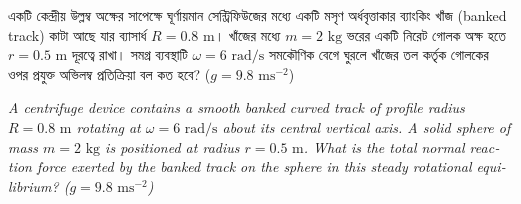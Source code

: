 \documentclass[12pt, a4paper]{article}
\begin{document}
\begin{tcolorbox}[questionbox={প্রশ্ন (Question) 43}]
    \noindent
    একটি কেন্দ্রীয় উল্লম্ব অক্ষের সাপেক্ষে ঘূর্ণায়মান সেন্ট্রিফিউজের মধ্যে একটি মসৃণ অর্ধবৃত্তাকার ব্যাংকিং খাঁজ (banked track) কাটা আছে যার ব্যাসার্ধ $R = 0.8\text{ m}$। খাঁজের মধ্যে $m = 2\text{ kg}$ ভরের একটি নিরেট গোলক অক্ষ হতে $r = 0.5\text{ m}$ দূরত্বে রাখা। সমগ্র ব্যবস্থাটি $\omega = 6\text{ rad/s}$ সমকৌণিক বেগে ঘুরলে খাঁজের তল কর্তৃক গোলকের ওপর প্রযুক্ত অভিলম্ব প্রতিক্রিয়া বল কত হবে? ($g = 9.8\text{ ms}^{-2}$)
    
    \vspace{0.8em}
    \begin{english}
    \noindent\textit{\color{darkgray}
    A centrifuge device contains a smooth banked curved track of profile radius $R = 0.8\text{ m}$ rotating at $\omega = 6\text{ rad/s}$ about its central vertical axis. A solid sphere of mass $m = 2\text{ kg}$ is positioned at radius $r = 0.5\text{ m}$. What is the total normal reaction force exerted by the banked track on the sphere in this steady rotational equilibrium? ($g = 9.8\text{ ms}^{-2}$)
    }
    \end{english}
\end{tcolorbox}

\vspace{1em}
\begin{center}
\end{center}
\vspace{1em}
\end{document}
